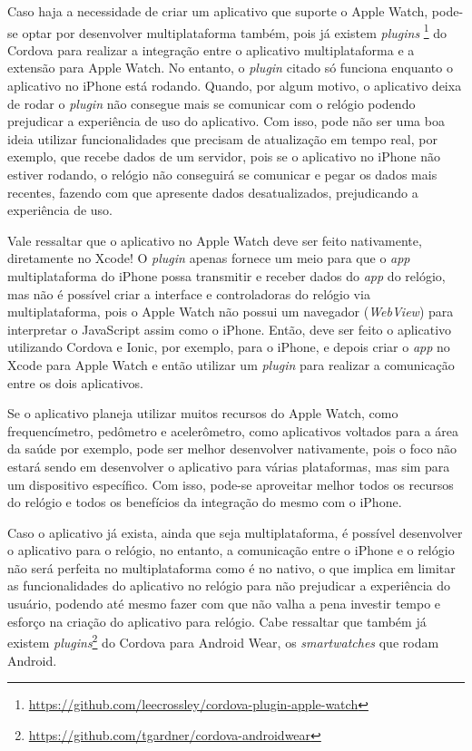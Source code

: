 Caso haja a necessidade de criar um aplicativo que suporte o Apple Watch, pode-se optar por desenvolver multiplataforma também, pois já existem \textit{plugins}
\footnote{\url{https://github.com/leecrossley/cordova-plugin-apple-watch}} 
do Cordova para realizar a integração entre o aplicativo multiplataforma e a extensão para Apple Watch. No entanto, o \textit{plugin} citado só funciona enquanto o aplicativo no iPhone está rodando. Quando, por algum motivo, 
o aplicativo deixa de rodar o \textit{plugin} não consegue mais se comunicar com o relógio podendo prejudicar a experiência de uso do aplicativo. Com isso, pode não ser uma boa ideia utilizar funcionalidades que 
precisam de atualização em tempo real, por exemplo, que recebe dados de um servidor, pois se o aplicativo no iPhone não estiver rodando, o relógio não conseguirá se comunicar e pegar os dados mais recentes, fazendo com 
que apresente dados desatualizados, prejudicando a experiência de uso.

Vale ressaltar que o aplicativo no Apple Watch deve ser feito nativamente, diretamente no Xcode! O \textit{plugin} apenas fornece um meio para que o \textit{app} multiplataforma do iPhone possa transmitir e receber dados do \textit{app}
do relógio, mas não é possível criar a interface e controladoras do relógio via multiplataforma, pois o Apple Watch não possui um navegador (\textit{WebView}) para interpretar o JavaScript assim como o iPhone. Então, 
deve ser feito o aplicativo utilizando Cordova e Ionic, por exemplo, para o iPhone, e depois criar o \textit{app} no Xcode para Apple Watch e então utilizar um \textit{plugin} para realizar a comunicação entre os dois aplicativos.  

Se o aplicativo planeja utilizar muitos recursos do Apple Watch, como frequencímetro, pedômetro e acelerômetro, como aplicativos voltados para a área da saúde por exemplo, pode ser melhor desenvolver nativamente,
pois o foco não estará sendo em desenvolver o aplicativo para várias plataformas, mas sim para um dispositivo específico. Com isso, pode-se aproveitar melhor todos os recursos do relógio e todos os benefícios da integração
do mesmo com o iPhone.

Caso o aplicativo já exista, ainda que seja multiplataforma, é possível desenvolver o aplicativo para o relógio, no entanto, a comunicação entre o iPhone e o relógio não será perfeita no multiplataforma como é no nativo, 
o que implica em limitar as funcionalidades do aplicativo no relógio para não prejudicar a experiência do usuário, podendo até mesmo fazer com que não valha a pena investir tempo e esforço na criação do aplicativo para
relógio. Cabe ressaltar que também já existem \textit{plugins}\footnote{\url{https://github.com/tgardner/cordova-androidwear}} do Cordova para Android Wear, os \textit{smartwatches} que rodam Android.

